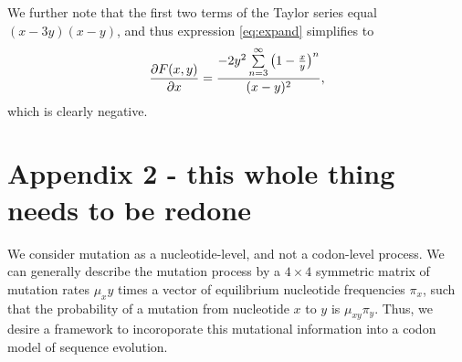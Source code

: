 \documentclass{pnastwo}
\begin{document}
\begin{article}
We further note that the first two terms of the Taylor series equal $(x-3y)(x-y)$, and thus expression \eqref{eq:expand} simplifies to 
\begin{equation}
\frac{\partial{F(x,y)}}{\partial{x}} = \frac{-2y^2\sum\limits_{n=3}^\infty \big{(}1-\frac{x}{y}\big{)}^n}{(x-y)^2} ,
\end{equation}
which is clearly negative. 


\bigskip



\section*{Appendix 2 - this whole thing needs to be redone}

We consider mutation as a nucleotide-level, and not a codon-level process. We can generally describe the mutation process by a $4\times4$ symmetric matrix of mutation rates $\mu_xy$ times a vector of equilibrium nucleotide frequencies $\pi_x$, such that the probability of a mutation from nucleotide $x$ to $y$ is $\mu_{xy}\pi_y$. Thus, we desire a framework to incoroporate this mutational information into a codon model of sequence evolution. 








\end{article}
\end{document}
